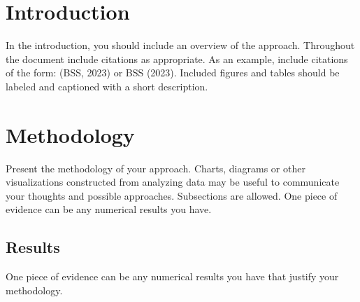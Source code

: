 \documentclass[competition,nonblindrev]{informs3-competition}
\begin{document}



\ARTICLEAUTHORS{%
\AUTHOR{Corresponding Author}
\AFF{Address, Town, State, Zip code, Country, \EMAIL{CorrespondingAuthor@email.com}} %
} %




\maketitle

\section{Introduction}

In the introduction, you should include an overview of the approach. Throughout the document include citations as appropriate. As an example, include citations of the form: (BSS, 2023) or BSS (2023). Included figures and tables should be labeled and captioned with a short description.


\section{Methodology}

Present the methodology of your approach. Charts, diagrams or other visualizations constructed from analyzing data may be useful to communicate your thoughts and possible approaches. Subsections are allowed. One piece of evidence can be any numerical results you have.


\subsection{Results}
One piece of evidence can be any numerical results you have that justify your methodology.
\end{document}
